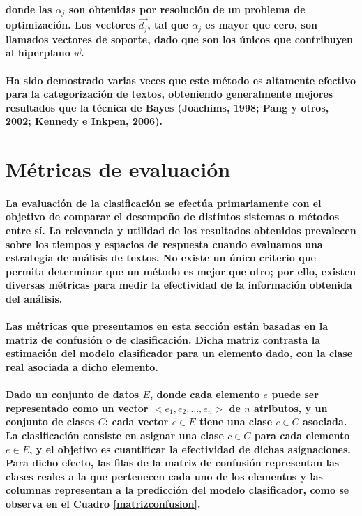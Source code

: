 \paragraph{donde las $\alpha_{j}$ son obtenidas por resoluci\'on de un problema de optimizaci\'on. Los vectores $\vec{d_{j}}$, tal que $\alpha_{j}$ es mayor que cero, son llamados vectores de soporte, dado que son los \'unicos que contribuyen al hiperplano $\vec{w}$.}
\paragraph{Ha sido demostrado varias veces que este m\'etodo es altamente efectivo para la categorizaci\'on de textos, obteniendo generalmente mejores resultados que la t\'ecnica de Bayes (Joachims, 1998; Pang y otros, 2002; Kennedy e Inkpen, 2006).}


\section{M\'etricas de evaluaci\'on}
\paragraph{La evaluaci\'on de la clasificaci\'on se efect\'ua primariamente con el objetivo de comparar el desempe\~no de distintos sistemas o m\'etodos entre s\'i. La relevancia y utilidad de los resultados obtenidos prevalecen sobre los tiempos y espacios de respuesta cuando evaluamos una estrategia de an\'alisis de textos. No existe un \'unico criterio que permita determinar que un m\'etodo es mejor que otro; por ello, existen diversas m\'etricas para medir la efectividad de la informaci\'on obtenida del an\'alisis.}
\paragraph{Las m\'etricas que presentamos en esta secci\'on est\'an basadas en la matriz de confusi\'on o de clasificaci\'on. Dicha matriz contrasta la estimaci\'on del modelo clasificador para un elemento dado, con la clase real asociada a dicho elemento.}
\paragraph{Dado un conjunto de datos $E$, donde cada elemento $e$ puede ser representado como un vector $< e_1, e_2, \dots, e_n >$ de $n$ atributos, y un conjunto de clases $C$; cada vector $e \in E$ tiene una clase $c \in C$ asociada. La clasificaci\'on consiste en asignar una clase $c \in C$ para cada elemento $e \in E$, y el objetivo es cuantificar la efectividad de dichas asignaciones. Para dicho efecto, las filas de la matriz de confusi\'on representan las clases reales a la que pertenecen cada uno de los elementos y las columnas representan a la predicci\'on del modelo clasificador, como se observa en el Cuadro \ref{matrizconfusion}.}

